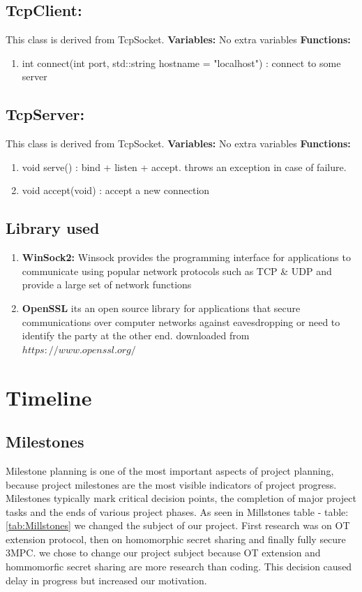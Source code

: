 \documentclass[12pt]{article}
\begin{document}
\subsection{TcpClient:}
This class is derived from TcpSocket.\hfill\break
\textbf{Variables:}  No extra variables \hfill\break
\textbf{Functions:}
\begin{enumerate}
	\item int connect(int port, std::string hostname = "localhost") : connect to some server
\end{enumerate}
\subsection{TcpServer:}
This class is derived from TcpSocket.\hfill\break
\textbf{Variables:}  No extra variables \hfill\break
\textbf{Functions:}
\begin{enumerate}
	\item void serve() : bind + listen + accept. throws an exception in case of failure.
	
	\item void accept(void) : accept a new connection
\end{enumerate}
\subsection{Library used}
\begin{enumerate}
	\item \textbf{WinSock2:} Winsock provides the programming interface for applications to communicate using popular network protocols such as TCP \& UDP and provide a large set of network functions 
	\item \textbf{OpenSSL} its an open source library for applications that secure communications over computer networks against eavesdropping or need to identify the party at the other end. downloaded from $https://www.openssl.org/$
\end{enumerate}

\pagebreak
\section{Timeline}


\subsection{Milestones}
Milestone planning is one of the most important aspects of project planning, because project milestones are the most visible indicators of project progress. Milestones typically mark critical decision points, the completion of major project tasks and the ends of various project phases. 
\hfill\break
As seen in Millstones table - table: \ref{tab:Millstones} we changed the subject of our project. First research was on OT extension protocol, then on homomorphic secret sharing and finally fully secure 3MPC. we chose to change our project subject because OT extension and hommomorfic secret sharing are more research than coding. This decision caused delay in progress but increased our motivation.
\end{document}
